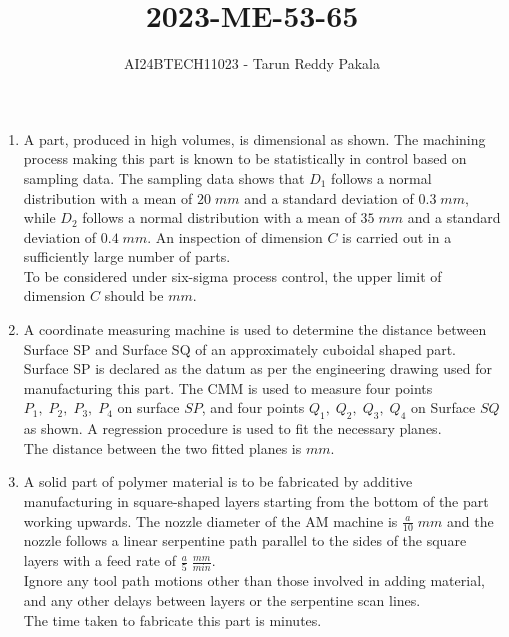 \documentclass[journal,12pt,onecolumn]{IEEEtran}
\title{2023-ME-53-65}
\author{AI24BTECH11023 - Tarun Reddy Pakala}
\theoremstyle{remark}
\begin{document}


\maketitle
\bigskip
\renewcommand{\thefigure}{\theenumi}
\renewcommand{\thetable}{\theenumi}
\begin{enumerate}[start=53]
\item A part, produced in high volumes, is dimensional as shown. The machining process making this part is known to be statistically in control based on sampling data. The sampling data shows that $D_1$ follows a normal distribution with a mean of $20\;mm$ and a standard deviation of $0.3\;mm$, while $D_2$ follows a normal distribution with a mean of $35\;mm$ and a standard deviation of $0.4\;mm$. An inspection of dimension $C$ is carried out in a sufficiently large number of parts.\\ To be considered under six-sigma process control, the upper limit of dimension $C$ should be \underline{\hspace{2cm}} $mm$.\\ 

\item A coordinate measuring machine  is used to determine the distance between Surface SP and Surface SQ of an approximately cuboidal shaped part. Surface SP is declared as the datum as per the engineering drawing used for manufacturing this part. The CMM is used to measure four points $P_1,\;P_2,\;P_3,\;P_4$ on surface $SP$, and four points $Q_1,\;Q_2,\;Q_3,\;Q_4$ on Surface $SQ$ as shown. A regression procedure is used to fit the necessary planes.\\ The distance between the two fitted planes is 
\underline{\hspace{2cm}} $mm$.\\ 

\item A solid part  of polymer material is to be fabricated by additive manufacturing  in square-shaped layers starting from the bottom of the part working upwards. The nozzle diameter of the AM machine is $\frac{a}{10}\;mm$ and the nozzle follows a linear serpentine path parallel to the sides of the square layers with a feed rate of $\frac{a}{5}\;\frac{mm}{min}$.\\ Ignore any tool path motions other than those involved in adding material, and any other delays between layers or the serpentine scan lines.\\ The time taken to fabricate this part is \underline{\hspace{2cm}} minutes.\\ 

\end{enumerate}
\end{document}
